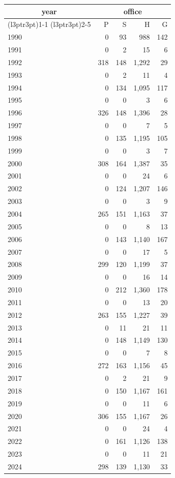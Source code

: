 \footnotesize\begin{tabular}[t]{lrrrr}
\toprule
\multicolumn{1}{c}{year} & \multicolumn{4}{c}{office} \\
\cmidrule(l{3pt}r{3pt}){1-1} \cmidrule(l{3pt}r{3pt}){2-5}
  & P & S & H & G\\
\midrule
1990 & 0 & 93 & 988 & 142\\
1991 & 0 & 2 & 15 & 6\\
1992 & 318 & 148 & 1,292 & 29\\
1993 & 0 & 2 & 11 & 4\\
1994 & 0 & 134 & 1,095 & 117\\
1995 & 0 & 0 & 3 & 6\\
1996 & 326 & 148 & 1,396 & 28\\
1997 & 0 & 0 & 7 & 5\\
1998 & 0 & 135 & 1,195 & 105\\
1999 & 0 & 0 & 3 & 7\\
2000 & 308 & 164 & 1,387 & 35\\
2001 & 0 & 0 & 24 & 6\\
2002 & 0 & 124 & 1,207 & 146\\
2003 & 0 & 0 & 3 & 9\\
2004 & 265 & 151 & 1,163 & 37\\
2005 & 0 & 0 & 8 & 13\\
2006 & 0 & 143 & 1,140 & 167\\
2007 & 0 & 0 & 17 & 5\\
2008 & 299 & 120 & 1,199 & 37\\
2009 & 0 & 0 & 16 & 14\\
2010 & 0 & 212 & 1,360 & 178\\
2011 & 0 & 0 & 13 & 20\\
2012 & 263 & 155 & 1,227 & 39\\
2013 & 0 & 11 & 21 & 11\\
2014 & 0 & 148 & 1,149 & 130\\
2015 & 0 & 0 & 7 & 8\\
2016 & 272 & 163 & 1,156 & 45\\
2017 & 0 & 2 & 21 & 9\\
2018 & 0 & 150 & 1,167 & 161\\
2019 & 0 & 0 & 11 & 6\\
2020 & 306 & 155 & 1,167 & 26\\
2021 & 0 & 0 & 24 & 4\\
2022 & 0 & 161 & 1,126 & 138\\
2023 & 0 & 0 & 11 & 21\\
2024 & 298 & 139 & 1,130 & 33\\
\bottomrule
\end{tabular}
